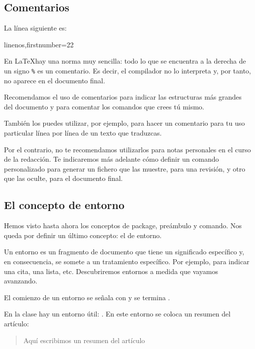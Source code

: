 \subsection{Comentarios}

La línea siguiente es: 
\begin{latexcode*}{linenos,firstnumber=22}
\end{latexcode*}

En \LaTeX hay una norma muy sencilla: todo lo que se encuentra a la derecha de un signo \verb|%| es un comentario.
Es decir, el compilador no lo interpreta y, por tanto, no aparece en el documento final. 

Recomendamos el uso de comentarios para indicar las estructuras más grandes del documento y para comentar los comandos que crees tú mismo. 

También los puedes utilizar, por ejemplo, para hacer un comentario para tu uso particular línea por línea de un texto que traduzcas.

Por el contrario, no te recomendamos utilizarlos para notas personales en el curso de la redacción. Te indicaremos más adelante cómo definir un comando personalizado para generar un fichero que las muestre, para una revisión, y otro que las oculte, para el documento final.



\subsection{El concepto de entorno}

Hemos visto hasta ahora los conceptos de package, preámbulo y comando. Nos queda por definir un último concepto: el de entorno.

Un entorno es un fragmento de documento que tiene un significado específico y, en consecuencia, se somete a un tratamiento específico. Por ejemplo, para indicar una cita, una lista, etc. Descubriremos entornos a medida que vayamos avanzando. 


El comienzo de un entorno se señala   con  y se termina .

En la clase  hay un entorno útil: . En este entorno se coloca un resumen del artículo:

\begin{latexcode}
\begin{abstract}
Aquí escribimos un resumen del artículo 
\end{abstract}
\end{latexcode}


